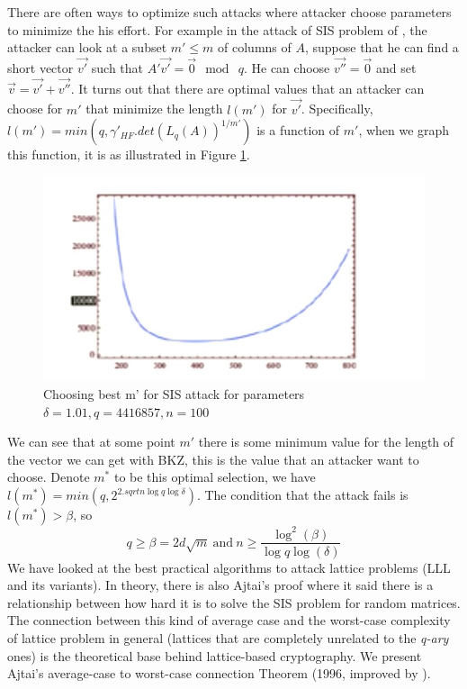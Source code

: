 There are often ways to optimize such attacks where attacker choose parameters
to minimize the his effort. For example in the attack of SIS problem of
\cite{micciancio2008lattice}, the attacker can look at a subset $m' \leq m$ of
columns of $A$, suppose that he can find a short vector $\vec{v'}$ such that
$A'\vec{v'} = \vec{0} \mod \ q$. He can choose $\vec{v''} = \vec{0}$ and set
$\vec{v} = \vec{v'} + \vec{v''}$. It turns out that there are optimal values
that an attacker can choose for $m'$ that minimize the length $l(m')$ for
$\vec{v'}$.  Specifically, $l(m') = min(q,\gamma'_{HF}.det(L_q(A))^{1/m'})$ is a
function of $m'$, when we graph this function, it is as illustrated in Figure
\ref{fig:bestAttack}.
\begin{figure}[h]
  \centering \includegraphics[scale=0.3]{bestattack}
  \caption{Choosing best m' for SIS attack for parameters
    $\delta = 1.01, q=4416857, n=100$}
  \label{fig:bestAttack}
\end{figure}
We can see that at some point $m'$ there is some minimum value for the length of
the vector we can get with BKZ, this is the value that an attacker want to
choose. Denote $m^*$ to be this optimal selection, we have
$l(m^*) = min(q, 2^{2.sqrt{n\log q\log \delta}})$. The condition that the attack
fails is $l(m^*) > \beta$, so
\[
  q \geq \beta = 2d\sqrt{m} \ \text{and}\ n \geq \frac{\log^2(\beta)}{\log q
    \log(\delta)}
\]
We have looked at the best practical algorithms to attack lattice problems (LLL
and its variants). In theory, there is also Ajtai's proof where it said there is
a relationship between how hard it is to solve the SIS problem for random
matrices. The connection between this kind of average case and the worst-case
complexity of lattice problem in general (lattices that are completely unrelated
to the \emph{q-ary} ones) is the theoretical base behind lattice-based
cryptography. We present Ajtai's average-case to worst-case connection Theorem
(1996, improved by \cite{gentry2008trapdoors}).

